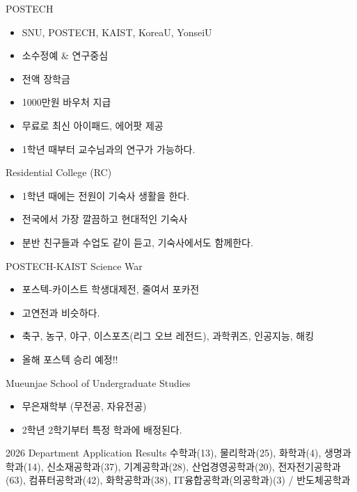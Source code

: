\documentclass[12pt,aspectratio=169]{beamer}
\newenvironment{mainitemize}{\begin{itemize}\setlength{\itemsep}{0.72em}}{\end{itemize}}
\begin{document}
\begin{frame}{POSTECH}
\begin{mainitemize}
  \item SNU, POSTECH, KAIST, KoreaU, YonseiU
  \item 소수정예 \& 연구중심
  \item 전액 장학금
  \item 1000만원 바우처 지급
  \item 무료로 최신 아이패드, 에어팟 제공
  \item 1학년 때부터 교수님과의 연구가 가능하다.
\end{mainitemize}
\end{frame}

\begin{frame}{Residential College (RC)}
\begin{mainitemize}
  \item 1학년 때에는 전원이 기숙사 생활을 한다.
  \item 전국에서 가장 깔끔하고 현대적인 기숙사
  \item 분반 친구들과 수업도 같이 듣고, 기숙사에서도 함께한다.
\end{mainitemize}
\end{frame}

\begin{frame}{POSTECH-KAIST Science War}
\begin{mainitemize}
  \item 포스텍-카이스트 학생대제전, 줄여서 포카전
  \item 고연전과 비슷하다.
  \item 축구, 농구, 야구, 이스포츠(리그 오브 레전드), 과학퀴즈, 인공지능, 해킹
  \item 올해 포스텍 승리 예정!!
\end{mainitemize}
\end{frame}

\begin{frame}{Mueunjae School of Undergraduate Studies}
\begin{mainitemize}
  \item 무은재학부 (무전공, 자유전공)
  \item 2학년 2학기부터 특정 학과에 배정된다.
\end{mainitemize}
\begin{block}{2026 Department Application Results}
\small
수학과(13), 물리학과(25), 화학과(4), 생명과학과(14), 신소재공학과(37), 기계공학과(28), 산업경영공학과(20), 전자전기공학과(63), 컴퓨터공학과(42), 화학공학과(38), IT융합공학과(의공학과)(3) / 반도체공학과
\end{block}
\end{frame}
\end{document}
